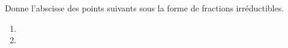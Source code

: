%
%
  Donne l'abscisse des points suivants sous la forme de fractions irréductibles.
  \begin{enumerate}
    \item 
    \item 
  \end{enumerate}
